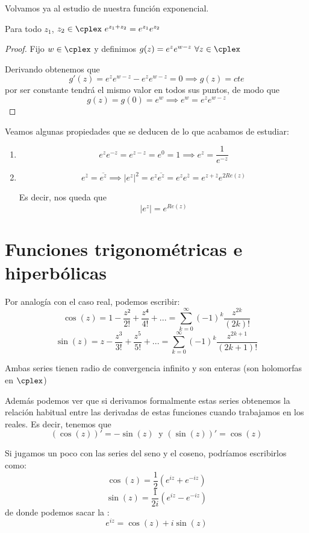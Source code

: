 \documentclass{apuntes}
\begin{document}
Volvamos ya al estudio de nuestra función exponencial.
\begin{prop}
Para todo $z_1$, $z_2 \in \cplex \ e^{z_1+z_2}=e^{z_1}e^{z_2}$
\end{prop}
\begin{proof}
Fijo $w \in \cplex$ y definimos $g(z)=e^z e^{w-z} \ \forall z \in \cplex$

Derivando obtenemos que
\[g'(z)=e^z e^{w-z}-e^ze^{w-z}=0 \implies g(z)=cte\]
por ser constante tendrá el mismo valor en todos sus puntos, de modo que
\[g(z)=g(0)=e^w \implies e^w=e^ze^{w-z}\]
\end{proof}

Veamos algunas propiedades que se deducen de lo que acabamos de estudiar:
\begin{enumerate}
\item \[e^ze^{-z}=e^{z-z}=e^0=1 \implies e^z=\frac{1}{e^{-z}}\]
\item \[e^{\bar{z}}=\overline{e^z} \implies |e^z|^2=e^z\overline{e^z} = e^z e^{\bar{z}}=e^{z+\bar{z}} e^{2 Re(z)}\]

Es decir, nos queda que
\[|e^z|=e^{Re(z)}\]
\end{enumerate}


\section{Funciones trigonométricas e hiperbólicas}
Por analogía con el caso real, podemos escribir:
\[\cos(z)=1-\frac{z²}{2!}+\frac{z⁴}{4!}+... = \sum_{k=0}^{\infty}(-1)^k\frac{z^{2k}}{(2k)!}\]
\[\sin(z)=z-\frac{z^3}{3!}+\frac{z^5}{5!}+... = \sum_{k=0}^{\infty}(-1)^k\frac{z^{2k+1}}{(2k+1)!}\]

Ambas series tienen radio de convergencia infinito y son enteras (son holomorfas en $\cplex$)

Además podemos ver que si derivamos formalmente estas series obtenemos la relación habitual entre las derivadas de estas funciones cuando trabajamos en los reales. Es decir, tenemos que
\[(\cos(z))'=-\sin(z) \ \text{ y } (\sin(z))'=\cos(z)\]

Si jugamos un poco con las series del seno y el coseno, podríamos escribirlos como:
\[\cos(z)=\frac{1}{2}\left( e^{iz}+e^{-iz}\right)\]
\[\sin(z)=\frac{1}{2i}\left( e^{iz}-e^{-iz}\right)\]
de donde podemos sacar la :
\[e^{iz}=\cos(z)+i\sin(z)\]
\end{document}
